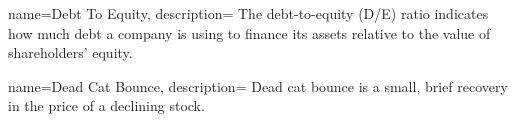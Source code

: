 {
	name={Debt To Equity},
	description={
		The debt-to-equity (D/E) ratio indicates how much debt a company is using to finance its assets relative to the value of shareholders' equity.
	}
}

{
	name={Dead Cat Bounce},
	description={
		Dead cat bounce is a small, brief recovery in the price of a declining stock.
	}
}